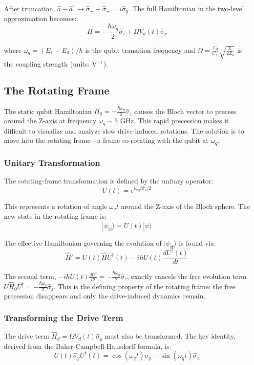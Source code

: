 \documentclass{article}
\begin{document}
After truncation, $\hat{a} - \hat{a}^\dagger \to \hat{\sigma}_- - \hat{\sigma}_+ = i\hat{\sigma}_y$. The full Hamiltonian in the two-level approximation becomes:
$$\hat{H} = -\frac{\hbar\omega_q}{2} \hat{\sigma}_z + \Omega V_d(t) \hat{\sigma}_y$$

where $\omega_q = (E_1 - E_0)/\hbar$ is the qubit transition frequency and $\Omega = \frac{C_d}{C_\Sigma}\sqrt{\frac{\hbar}{2Z_0}}$ is the coupling strength (units: V$^{-1}$).

\subsection{The Rotating Frame}

The static qubit Hamiltonian $H_0 = -\frac{\hbar\omega_q}{2}\hat{\sigma}_z$ causes the Bloch vector to precess around the Z-axis at frequency $\omega_q \sim 5$ GHz. This rapid precession makes it difficult to visualize and analyze slow drive-induced rotations. The solution is to move into the rotating frame—a frame co-rotating with the qubit at $\omega_q$.

\subsubsection*{Unitary Transformation}

The rotating-frame transformation is defined by the unitary operator:
$$U(t) = e^{i\omega_q t \hat{\sigma}_z / 2}$$

This represents a rotation of angle $\omega_q t$ around the Z-axis of the Bloch sphere. The new state in the rotating frame is:
$$|\psi_{\text{rf}}\rangle = U(t)|\psi\rangle$$

The effective Hamiltonian governing the evolution of $|\psi_{\text{rf}}\rangle$ is found via:
$$\hat{H}' = U(t) \hat{H} U^\dagger(t) - i\hbar U(t) \frac{dU^\dagger(t)}{dt}$$

The second term, $-i\hbar U(t)\frac{dU^\dagger}{dt} = -\frac{\hbar\omega_q}{2}\hat{\sigma}_z$, exactly cancels the free evolution term $U \hat{H}_0 U^\dagger = -\frac{\hbar\omega_q}{2}\hat{\sigma}_z$. This is the defining property of the rotating frame: the free precession disappears and only the drive-induced dynamics remain.

\subsubsection*{Transforming the Drive Term}

The drive term $\hat{H}_d = \Omega V_d(t) \hat{\sigma}_y$ must also be transformed. The key identity, derived from the Baker-Campbell-Hausdorff formula, is:
$$U(t) \hat{\sigma}_y U^\dagger(t) = \cos(\omega_q t) \hat{\sigma}_y - \sin(\omega_q t) \hat{\sigma}_x$$
\end{document}
